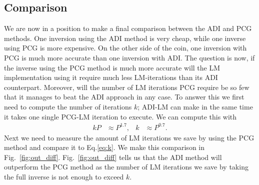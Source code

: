 \documentclass[useAMS,usenatbib]{mn2e}
\begin{document}
\subsection{Comparison}
\label{sec:comparison}
We are now in a position to make a final comparison between the ADI and PCG methods. One inversion using the ADI method is very cheap, while one inverse using PCG is more expensive. On the other side of the coin,  one inversion with PCG is much more 
accurate than one inversion with ADI. The question is now, if the inverse using the PCG method is much more accurate will the LM implementation using it require much less LM-iterations than its ADI counterpart. Moreover, will the number 
of LM iterations PCG require be so few that it manages to beat the ADI approach in any case. To answer this we first need to compute the number of iterations $k$; ADI-LM can make in the 
same time it takes one single PCG-LM iteration to execute. We can compute this with
\begin{align}
\label{eq:k}
 kP &\approx P^{1.7}, & k &\approx P^{0.7}.
\end{align}
Next we need to measure the amount of LM iterations we save by using the PCG method and compare it to Eq.\eqref{eq:k}. We make this comparison 
in Fig.~\ref{fig:out_diff}. Fig.~\ref{fig:out_diff} tells us that the ADI method will outperform the PCG method as the number of LM iterations we save by taking the 
full inverse is not enough to exceed $k$.
\end{document}
